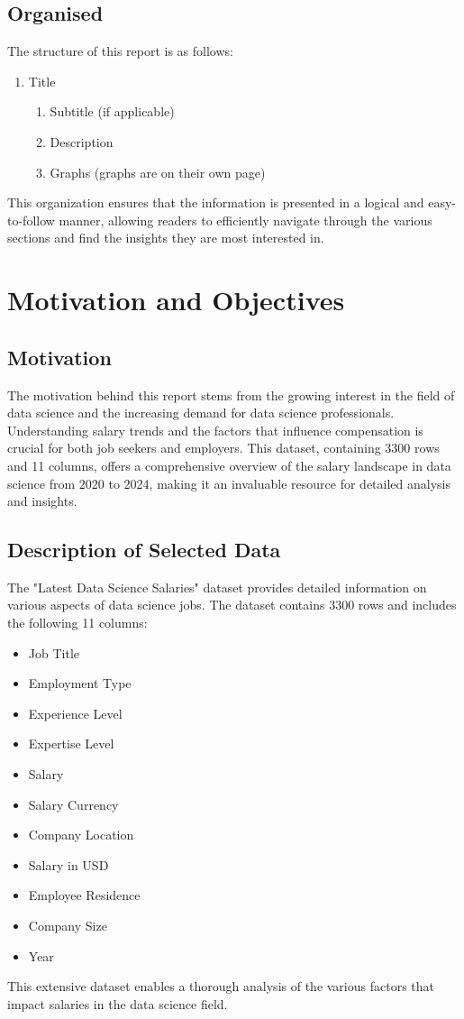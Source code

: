 \documentclass{article}\usepackage[]{graphicx}\usepackage[]{xcolor}
\begin{document}
\subsection{Organised}
The structure of this report is as follows:
\begin{enumerate}
    \item Title
    \begin{enumerate}
        \item Subtitle (if applicable)
        \item Description
        \item Graphs (graphs are on their own page)
    \end{enumerate}
\end{enumerate}

This organization ensures that the information is presented in a logical and easy-to-follow manner, allowing readers to efficiently navigate through the various sections and find the insights they are most interested in.


\newpage
\section{Motivation and Objectives}
\subsection{Motivation}
The motivation behind this report stems from the growing interest in the field of data science and the increasing demand for data science professionals. Understanding salary trends and the factors that influence compensation is crucial for both job seekers and employers. This dataset, containing 3300 rows and 11 columns, offers a comprehensive overview of the salary landscape in data science from 2020 to 2024, making it an invaluable resource for detailed analysis and insights.

\subsection{Description of Selected Data}
The "Latest Data Science Salaries" dataset provides detailed information on various aspects of data science jobs. The dataset contains 3300 rows and includes the following 11 columns:
\begin{itemize}
    \item Job Title
    \item Employment Type
    \item Experience Level
    \item Expertise Level
    \item Salary
    \item Salary Currency
    \item Company Location
    \item Salary in USD
    \item Employee Residence
    \item Company Size
    \item Year
\end{itemize}
This extensive dataset enables a thorough analysis of the various factors that impact salaries in the data science field.
\end{document}
